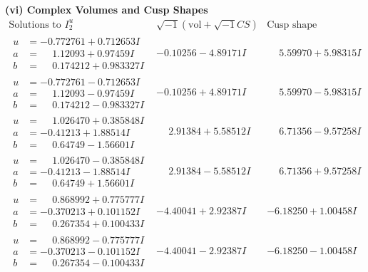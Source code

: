\documentclass[1p]{elsarticle_modified}
\theoremstyle{definition}
\newcommand{\I}{\sqrt{-1}}
\begin{document}
\newpage\flushleft \textbf{(vi) Complex Volumes and Cusp Shapes}
$$\begin{array}{c|c|c}  
\text{Solutions to }I^u_{2}& \I (\text{vol} + \sqrt{-1}CS) & \text{Cusp shape}\\
 \hline 
\begin{aligned}
u &= -0.772761 + 0.712653 I \\
a &= \phantom{-}1.12093 + 0.97459 I \\
b &= \phantom{-}0.174212 + 0.983327 I\end{aligned}
 & -0.10256 - 4.89171 I & \phantom{-}5.59970 + 5.98315 I \\ \hline\begin{aligned}
u &= -0.772761 - 0.712653 I \\
a &= \phantom{-}1.12093 - 0.97459 I \\
b &= \phantom{-}0.174212 - 0.983327 I\end{aligned}
 & -0.10256 + 4.89171 I & \phantom{-}5.59970 - 5.98315 I \\ \hline\begin{aligned}
u &= \phantom{-}1.026470 + 0.385848 I \\
a &= -0.41213 + 1.88514 I \\
b &= \phantom{-}0.64749 - 1.56601 I\end{aligned}
 & \phantom{-}2.91384 + 5.58512 I & \phantom{-}6.71356 - 9.57258 I \\ \hline\begin{aligned}
u &= \phantom{-}1.026470 - 0.385848 I \\
a &= -0.41213 - 1.88514 I \\
b &= \phantom{-}0.64749 + 1.56601 I\end{aligned}
 & \phantom{-}2.91384 - 5.58512 I & \phantom{-}6.71356 + 9.57258 I \\ \hline\begin{aligned}
u &= \phantom{-}0.868992 + 0.775777 I \\
a &= -0.370213 + 0.101152 I \\
b &= \phantom{-}0.267354 + 0.100433 I\end{aligned}
 & -4.40041 + 2.92387 I & -6.18250 + 1.00458 I \\ \hline\begin{aligned}
u &= \phantom{-}0.868992 - 0.775777 I \\
a &= -0.370213 - 0.101152 I \\
b &= \phantom{-}0.267354 - 0.100433 I\end{aligned}
 & -4.40041 - 2.92387 I & -6.18250 - 1.00458 I \\ \hline\begin{aligned}

\end{aligned}
\end{array}$$
\end{document}
